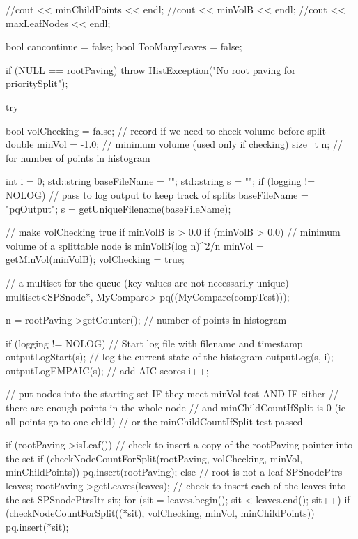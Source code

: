 \begin{DoxyCode}
{    
    //cout << minChildPoints << endl;
    //cout << minVolB << endl;
    //cout << maxLeafNodes << endl;
    
    bool cancontinue = false;
    bool TooManyLeaves = false;
    
    if (NULL == rootPaving) {
            throw HistException("No root paving for prioritySplit");
    }

    try {

        bool volChecking = false; // record if we need to check volume before
       split
        double minVol = -1.0; // minimum volume (used only if checking)
        size_t n; // for number of points in histogram

        int i = 0;
        std::string baseFileName = "";
        std::string s = "";
        if (logging != NOLOG) {
            // pass to log output to keep track of splits
            baseFileName = "pqOutput";
            s = getUniqueFilename(baseFileName);
        }

        // make volChecking true if minVolB is > 0.0
        if (minVolB > 0.0) {
            // minimum volume of a splittable node is minVolB(log n)^2/n
            minVol = getMinVol(minVolB);
           volChecking = true;
        }

        // a multiset for the queue (key values are not necessarily unique)
        multiset<SPSnode*, MyCompare> pq((MyCompare(compTest)));

        n = rootPaving->getCounter(); // number of points in histogram

        if (logging != NOLOG) {
             // Start log file with filename and timestamp
            outputLogStart(s);
            // log the current state of the histogram
            outputLog(s, i);
            outputLogEMPAIC(s); // add AIC scores
            i++;
        }

        // put nodes into the starting set IF they meet minVol test AND IF
       either
        // there are enough points in the whole node
                // and minChildCountIfSplit is 0 (ie all points go to one
       child)
        // or the minChildCountIfSplit test passed

        if (rootPaving->isLeaf()) {
            // check to insert a copy of the rootPaving pointer into the set
            if (checkNodeCountForSplit(rootPaving, volChecking, minVol,
                minChildPoints)) {
                    pq.insert(rootPaving);
            }
        }
        else { // root is not a leaf
            SPSnodePtrs leaves;
            rootPaving->getLeaves(leaves);
            // check to insert each of the leaves into the set
            SPSnodePtrsItr sit;
            for (sit = leaves.begin(); sit < leaves.end(); sit++) {
                if (checkNodeCountForSplit((*sit), volChecking, minVol,
                minChildPoints)) {
                    pq.insert(*sit);
                }
            }
        }

}}
\end{DoxyCode}
